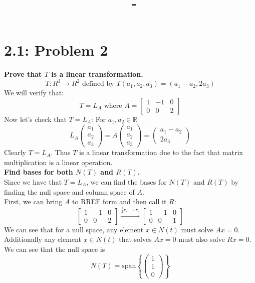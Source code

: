 \documentclass[answers,12pt,addpoints]{exam}
\author{\name}
\title{\course \ - \assignment}
\begin{document}
\maketitle

\section*{2.1: Problem 2}
\textbf{Prove that $T$ is a linear transformation.}\\
$$ T: R^3 \to R^2 \text{ defined by } T(a_1, a_2, a_3) = (a_1 - a_2, 2a_3) $$
We will verify that:
$$ T = L_A \text{ where } A = \begin{bmatrix} 1 & -1 & 0 \\ 0 & 0 & 2 \end{bmatrix} $$
Now let's check that $T = L_A$: For $a_1, a_2 \in \mathds{R}$
$$ L_A \begin{pmatrix}
a_1 \\ a_2 \\ a_3
\end{pmatrix} = A \begin{pmatrix}
a_1 \\ a_2 \\ a_3
\end{pmatrix} = \begin{pmatrix}
a_1 - a_2 \\ 2a_3
\end{pmatrix}$$
Clearly $T = L_A$. Thus $T$ is a linear transformation due to the fact that matrix multiplication is a linear operation.\\
\textbf{Find bases for both $N(T)$ and $R(T)$.}\\
Since we have that $T = L_A$, we can find the bases for $N(T)$ and $R(T)$ by finding the null space and column space of $A$.\\
First, we can bring $A$ to RREF form and then call it $R$:
$$ \begin{bmatrix}
1 & -1 & 0 \\ 0 & 0 & 2
\end{bmatrix} \xrightarrow{\frac{1}{2}r_2 \to r_2} \begin{bmatrix}
1 & -1 & 0 \\ 0 & 0 & 1
\end{bmatrix} $$
We can see that for a null space, any element $x \in N(t)$ must solve $Ax = 0$. Additionally any element $x \in N(t)$ that solves $Ax = 0$ must also solve $Rx = 0$. We can see that the null space is
$$ N(T) = \text{span} \left\{ \begin{pmatrix}
1 \\ 1 \\ 0
\end{pmatrix} \right\} $$
\end{document}
